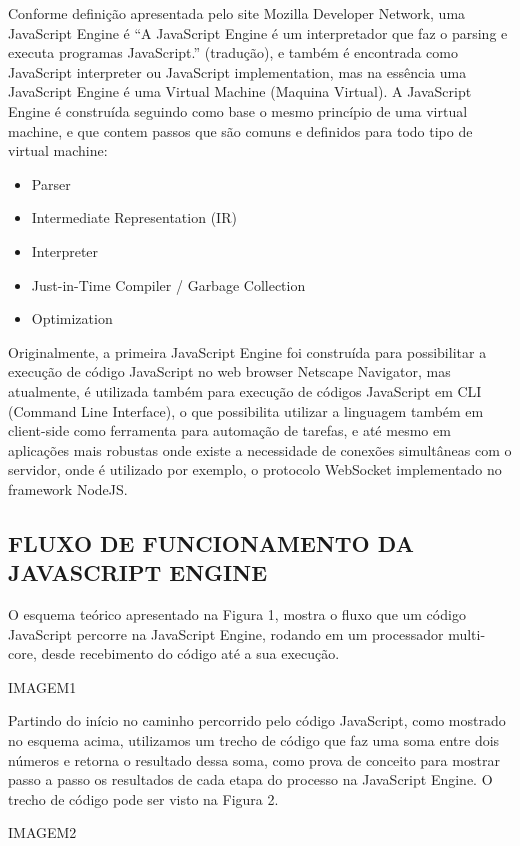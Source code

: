 \documentclass{article}
\begin{document}
Conforme definição apresentada pelo site Mozilla Developer Network, uma JavaScript
Engine é “A JavaScript Engine é um interpretador que faz o parsing e executa programas
JavaScript.” (tradução), e também é encontrada como JavaScript interpreter ou JavaScript
implementation, mas na essência uma JavaScript Engine é uma Virtual Machine (Maquina
Virtual).
A JavaScript Engine é construída seguindo como base o mesmo princípio de uma virtual
machine, e que contem passos que são comuns e definidos para todo tipo de virtual
machine:
\begin{itemize}
\item Parser
\item Intermediate Representation (IR)
\item Interpreter
\item Just-in-Time Compiler / Garbage Collection
\item Optimization
\end{itemize}
Originalmente, a primeira JavaScript Engine foi construída para possibilitar a execução de
código JavaScript no web browser Netscape Navigator, mas atualmente, é utilizada também
para execução de códigos JavaScript em CLI (Command Line Interface), o que possibilita
utilizar a linguagem também em client-side como ferramenta para automação de tarefas, e
até mesmo em aplicações mais robustas onde existe a necessidade de conexões
simultâneas com o servidor, onde é utilizado por exemplo, o protocolo WebSocket
implementado no framework NodeJS.

\subsection{FLUXO DE FUNCIONAMENTO DA JAVASCRIPT ENGINE}

O esquema teórico apresentado na Figura 1, mostra o fluxo que um código JavaScript
percorre na JavaScript Engine, rodando em um processador multi-core, desde recebimento
do código até a sua execução.

IMAGEM1

Partindo do início no caminho percorrido pelo código JavaScript, como mostrado no
esquema acima, utilizamos um trecho de código que faz uma soma entre dois números e
retorna o resultado dessa soma, como prova de conceito para mostrar passo a passo os
resultados de cada etapa do processo na JavaScript Engine. O trecho de código pode ser
visto na Figura 2.

IMAGEM2
\end{document}
